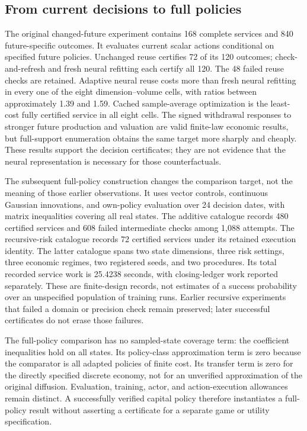 \documentclass[ecta,nameyear,draft]{econsocart}
\theoremstyle{definition}
\theoremstyle{remark}
\begin{document}
\subsection{From current decisions to full policies}
The original changed-future experiment contains 168 complete services and
840 future-specific outcomes. It evaluates current scalar actions conditional
on specified future policies. Unchanged reuse certifies 72 of its 120 outcomes;
check-and-refresh and fresh neural refitting each certify all 120. The 48
failed reuse checks are retained. Adaptive neural reuse costs more than fresh
neural refitting in every one of the eight dimension--volume cells, with
ratios between approximately 1.39 and 1.59. Cached sample-average optimization
is the least-cost fully certified service in all eight cells. The signed
withdrawal responses to stronger future production and valuation are valid
finite-law economic results, but full-support enumeration obtains the same
target more sharply and cheaply. These results support the decision
certificates; they are not evidence that the neural representation is
necessary for those counterfactuals.

The subsequent full-policy construction changes the comparison target, not
the meaning of those earlier observations. It uses vector controls,
continuous Gaussian innovations, and own-policy evaluation over 24 decision
dates, with matrix inequalities covering all real states. The additive
catalogue records 480 certified services and 608 failed intermediate checks
among 1,088 attempts. The recursive-risk catalogue records 72 certified
services under its retained execution identity. The latter catalogue spans
two state dimensions, three risk settings, three economic regimes, two
registered seeds, and two procedures. Its total recorded service work is
25.4238 seconds, with closing-ledger work reported separately. These are
finite-design records, not estimates of a success probability over an
unspecified population of training runs. Earlier recursive experiments
that failed a domain or precision check remain preserved; later successful
certificates do not erase those failures.

The full-policy comparison has no sampled-state coverage term: the coefficient
inequalities hold on all states. Its policy-class approximation term is zero
because the comparator is all adapted policies of finite cost. Its transfer
term is zero for the directly specified discrete economy, not for an
unverified approximation of the original diffusion. Evaluation, training,
actor, and action-execution allowances remain distinct. A successfully
verified capital policy therefore instantiates a full-policy result without
asserting a certificate for a separate game or utility specification.
\end{document}
